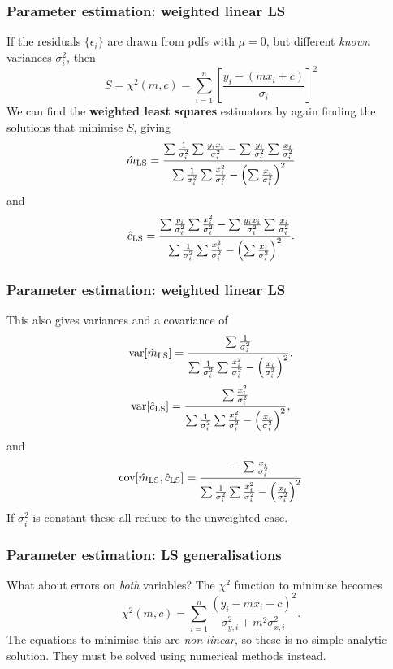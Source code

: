 \begin{frame}

\frametitle{Parameter estimation: weighted linear LS}
\label{parameterestimation:weightedlinearls}

If the residuals $\{\epsilon_i\}$ are drawn from pdfs with $\mu=0$, but different \emph{known}
variances $\sigma_i^2$, then
\[
S = \chi^2(m,c) = \sum_{i=1}^n \left[\frac{y_i - (mx_i + c)}{\sigma_i}\right]^2
\]
We can find the \textbf{weighted least squares} estimators by again finding the solutions
that minimise $S$, giving
\[
\hat{m}_{\rm LS} = \frac{\sum\frac{1}{\sigma_i^2}\sum \frac{y_ix_i}{\sigma_i^2} - \sum \frac{y_i}{\sigma_i^2} \sum \frac{x_i}{\sigma_i^2}}{\sum\frac{1}{\sigma_i^2}\sum \frac{x_i^2}{\sigma_i^2} - \left(\sum \frac{x_i}{\sigma_i^2}\right)^2}
\]
and
\[
\hat{c}_{\rm LS} = \frac{\sum \frac{y_i}{\sigma_i^2} \sum \frac{x_i^2}{\sigma_i^2} - \sum \frac{y_ix_i}{\sigma_i^2} \sum \frac{x_i}{\sigma_i^2}}{\sum\frac{1}{\sigma_i^2}\sum \frac{x_i^2}{\sigma_i^2} - \left(\sum \frac{x_i}{\sigma_i^2}\right)^2}.
\]

\end{frame}

\begin{frame}

\frametitle{Parameter estimation: weighted linear LS}
\label{parameterestimation:weightedlinearls}

This also gives variances and a covariance of
\[
\text{var}[\hat{m}_{\rm LS}] = \frac{\sum \frac{1}{\sigma_i^2}}{\sum \frac{1}{\sigma_i^2}\sum \frac{x_i^2}{\sigma_i^2} - \left(\frac{x_i}{\sigma_i^2}\right)^2},
\]
\[
\text{var}[\hat{c}_{\rm LS}] = \frac{\sum \frac{x_i^2}{\sigma_i^2}}{\sum \frac{1}{\sigma_i^2}\sum \frac{x_i^2}{\sigma_i^2} - \left(\frac{x_i}{\sigma_i^2}\right)^2},
\]
and
\[
\text{cov}[\hat{m}_{\rm LS},\hat{c}_{\rm LS}] = \frac{-\sum \frac{x_i}{\sigma_i^2}}{\sum \frac{1}{\sigma_i^2}\sum \frac{x_i^2}{\sigma_i^2} - \left(\frac{x_i}{\sigma_i^2}\right)^2}
\]
If $\sigma_i^2$ is constant these all reduce to the unweighted case.

\end{frame}

\begin{frame}

\frametitle{Parameter estimation: LS generalisations}
\label{parameterestimation:lsgeneralisations}

What about errors on \emph{both} variables? The $\chi^2$ function to minimise becomes
\[
\chi^2(m, c) = \sum_{i=1}^n \frac{(y_i - mx_i - c)^2}{\sigma_{y,i}^2 + m^2\sigma_{x,i}^2}.
\]
The equations to minimise this are \emph{non-linear}, so these is no simple analytic solution. They must
be solved using numerical methods instead.

\end{frame}

